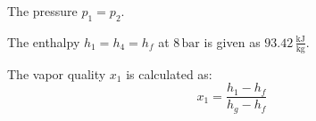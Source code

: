 The pressure \( p_1 = p_2 \).  

The enthalpy \( h_1 = h_4 = h_f \) at \( 8 \, \text{bar} \) is given as \( 93.42 \, \frac{\text{kJ}}{\text{kg}} \).  

The vapor quality \( x_1 \) is calculated as:  
\[
x_1 = \frac{h_1 - h_f}{h_g - h_f}
\]